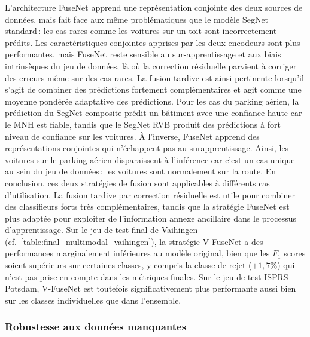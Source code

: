 L'architecture FuseNet apprend une représentation conjointe des deux sources de données, mais fait face aux même problématiques que le modèle SegNet standard\,: les cas rares comme les voitures sur un toit sont incorrectement prédits. Les caractéristiques conjointes apprises par les deux encodeurs sont plus performantes, mais FuseNet reste sensible au sur-apprentissage et aux biais intrinsèques du jeu de données, là où la correction résiduelle parvient à corriger des erreurs même sur des cas rares.
La fusion tardive est ainsi pertinente lorsqu'il s'agit de combiner des prédictions fortement complémentaires et agit comme une moyenne pondérée adaptative des prédictions. Pour les cas du parking aérien, la prédiction du SegNet composite prédit un bâtiment avec une confiance haute car le \gls{MNH} est fiable, tandis que le SegNet \gls{RVB} produit des prédictions à fort niveau de confiance sur les voitures. À l'inverse, FuseNet apprend des représentations conjointes qui n'échappent pas au surapprentissage. Ainsi, les voitures sur le parking aérien disparaissent à l'inférence car c'est un cas unique au sein du jeu de données\,: les voitures sont normalement sur la route.
En conclusion, ces deux stratégies de fusion sont applicables à différents cas d'utilisation. La fusion tardive par correction résiduelle est utile pour combiner des classifieurs forts très complémentaires, tandis que la stratégie FuseNet est plus adaptée pour exploiter de l'information annexe ancillaire dans le processus d'apprentissage.
Sur le jeu de test final de Vaihingen (cf.~\cref{table:final_multimodal_vaihingen}), la stratégie V-FuseNet a des performances marginalement inférieures au modèle original, bien que les $F_1$ scores soient supérieurs sur certaines classes, y compris la classe de rejet ($+1,7\%$) qui n'est pas prise en compte dans les métriques finales. Sur le jeu de test \gls{ISPRS} Potsdam, V-FuseNet est toutefois significativement plus performante aussi bien sur les classes individuelles que dans l'ensemble.

\subsubsection{Robustesse aux données manquantes}

